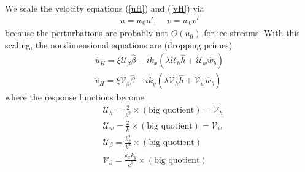 \documentclass[paper=a4, fontsize=11pt]{article}
\begin{document}
We scale the velocity equations (\ref{uH}) and (\ref{vH}) via
\begin{align}
u = w_0 u', \;\;\;\; v = w_0v'
\end{align}
because the perturbations are probably not $O(u_0)$ for ice streams.
With this scaling, the nondimensional equations are (dropping primes)
\begin{align}
\widehat{u}_H =    \xi\mathcal{U}_{\beta} \widehat{\beta} -ik_x\left(\lambda\mathcal{U}_h\widehat{h} +  \mathcal{U}_w\widehat{w}_b\right) \label{uHsc}\\
\widehat{v}_H =  \xi\mathcal{V}_{\beta} \widehat{\beta}-ik_y\left(\lambda\mathcal{V}_h\widehat{h} +  \mathcal{V}_w\widehat{w}_b\right)\label{vHsc}
\end{align}
where the response functions become
\begin{align}
&\mathcal{U}_h =   \frac{2}{k^2} \times (\text{big quotient}) = \mathcal{V}_h \\
&\mathcal{U}_w =  \frac{2}{k} \times (\text{big quotient}) = \mathcal{V}_w  \\
&\mathcal{U}_\beta =   \frac{k_x^2}{k^3} \times (\text{big quotient})\\
&\mathcal{V}_\beta =  \frac{k_x k_y}{k^3} \times (\text{big quotient})
\end{align}
\end{document}
